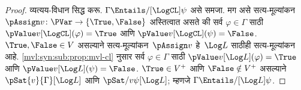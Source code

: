 \begin{proof}
  व्यत्यय-विधान सिद्ध करू. $\Gamma \Entails/[\LogCL] \psi$
  असे समजा. मग असे सत्य-मूल्यांकन~$\pAssign v\colon \PVar \to
  \{\True, \False\}$ अस्तित्वात असते की सर्व
  $\varphi \in \Gamma$ साठी $\pValue v[\LogCL](\varphi) = \True$
  आणि $\pValue v[\LogCL](\psi) = \False$.
  $\True, \False \in V$ असल्याने सत्य-मूल्यांकन~$\pAssign v$
  हे~$\Log L$ साठीही सत्य-मूल्यांकन आहे.
  \ref{mvl:syn:sub:prop:mvl-cl} नुसार सर्व $\varphi \in \Gamma$ साठी
  $\pValue v[\Log L](\varphi) = \True$ आणि
  $\pValue v[\Log L](\psi) = \False$.
  $\True \in V^+$ आणि $\False \notin V^+$ असल्याने
  $\pSat{v}{\Gamma}[\Log L]$ आणि
  $\pSat/{v}{\psi}[\Log L]$; म्हणजे
  $\Gamma \Entails/[\Log L] \psi$.
\end{proof}


